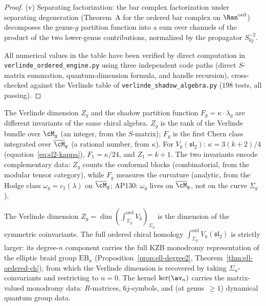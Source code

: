\begin{proof}
\textup{(v)} Separating factorization: the bar complex
factorization under separating degeneration
(Theorem~A for the ordered bar complex on $\Ran^{\mathrm{ord}}$)
decomposes the genus-$g$ partition function into a sum over
channels of the product of the two lower-genus contributions,
normalized by the propagator $S_{0j}^{-2}$.

All numerical values in the table have been verified by
direct computation in
\texttt{verlinde\_ordered\_engine.py}
using three independent code paths
(direct $S$-matrix summation, quantum-dimension formula,
and handle recursion), cross-checked against the Verlinde
table of \texttt{verlinde\_shadow\_algebra.py}
($198$ tests, all passing).
\end{proof}

\begin{remark}
\label{rem:verlinde-vs-shadow}
The Verlinde dimension $Z_g$ and the shadow partition
function $F_g = \kappa \cdot \lambda_g$ are different
invariants of the same chiral algebra. $Z_g$ is the rank of
the Verlinde bundle over $\cM_g$ (an integer, from the
$S$-matrix); $F_g$ is the first Chern class integrated
over $\overline{\cM}_g$ (a rational number, from $\kappa$).
For $V_k(\mathfrak{sl}_2)$:
$\kappa = 3(k{+}2)/4$ (equation~\eqref{eq:sl2-kappa}),
$F_1 = \kappa/24$, and $Z_1 = k + 1$.
The two invariants encode complementary data: $Z_g$ counts
the conformal blocks (combinatorial, from the modular tensor
category), while $F_g$ measures the curvature (analytic,
from the Hodge class $\omega_g = c_1(\lambda)$ on
$\overline{\cM}_g$; AP130: $\omega_g$ lives on
$\overline{\cM}_g$, not on the curve $\Sigma_g$).
\end{remark}

\begin{remark}
\label{rem:verlinde-ordered-refinement}
The Verlinde dimension $Z_g = \dim(\int_{\Sigma_g}^{\mathrm{ord}}
V_k)_{\Sigma_n}$ is the dimension of the symmetric coinvariants.
The full ordered chiral homology
$\int_{\Sigma_g}^{\mathrm{ord}} V_k(\mathfrak{sl}_2)$
is strictly larger: its degree-$n$ component carries the
full KZB monodromy representation of the elliptic braid
group $\mathrm{EB}_n$
(Proposition~\ref{prop:ell-degree2},
Theorem~\ref{thm:ell-ordered-ch}), from which the Verlinde
dimension is recovered by taking $\Sigma_n$-coinvariants
and restricting to $n = 0$. The kernel $\ker(\av_n)$
carries the matrix-valued monodromy data: $R$-matrices,
$6j$-symbols, and (at genus~$\geq 1$) dynamical quantum
group data.
\end{remark}


